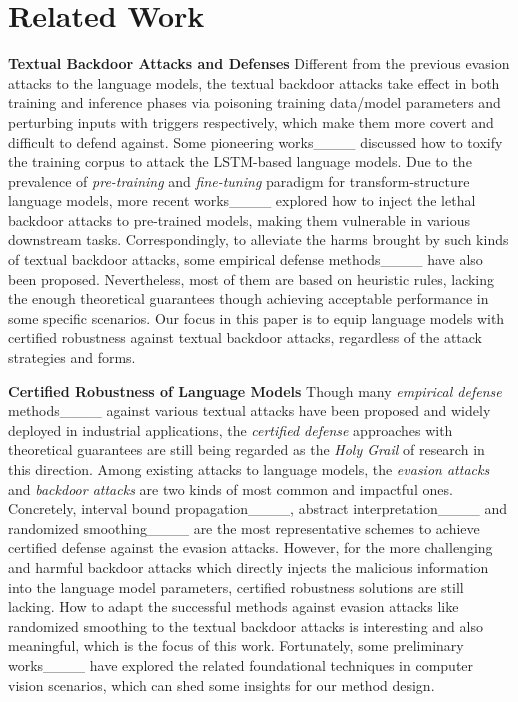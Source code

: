 \section{Related Work}
\textbf{Textual Backdoor Attacks and Defenses}
Different from the previous evasion attacks to the language models, the textual backdoor attacks take effect in both training and inference phases via poisoning training data/model parameters and perturbing inputs with triggers respectively, which make them more covert and difficult to defend against. Some pioneering works____ discussed how to toxify the training corpus to attack the LSTM-based language models. Due to the prevalence of \textit{pre-training} and \textit{fine-tuning} paradigm for transform-structure language models, more recent works____ explored how to inject the lethal backdoor attacks to pre-trained models, making them vulnerable in various downstream tasks. Correspondingly, to alleviate the harms brought by such kinds of textual backdoor attacks, some empirical defense methods____ have also been proposed. Nevertheless, most of them are based on heuristic rules, lacking the enough theoretical guarantees though achieving acceptable performance in some specific scenarios. Our focus in this paper is to equip language models with certified robustness against textual backdoor attacks, regardless of the attack strategies and forms.

\textbf{Certified Robustness of Language Models}
Though many \textit{empirical defense} methods____ against various textual attacks have been proposed and widely deployed in industrial applications, the \textit{certified defense} approaches with theoretical guarantees are still being regarded as the \textit{Holy Grail} of research in this direction. Among existing attacks to language models, the \textit{evasion attacks} and \textit{backdoor attacks} are two kinds of most common and impactful ones. Concretely, interval bound propagation____, abstract interpretation____ and randomized smoothing____ are the most representative schemes to achieve certified defense against the evasion attacks. However, for the more challenging and harmful backdoor attacks which directly injects the malicious information into the language model parameters, certified robustness solutions are still lacking. How to adapt the successful methods against evasion attacks like randomized smoothing to the textual backdoor attacks is interesting and also meaningful, which is the focus of this work. Fortunately, some preliminary works____ have explored the related foundational techniques in computer vision scenarios, which can shed some insights for our method design.